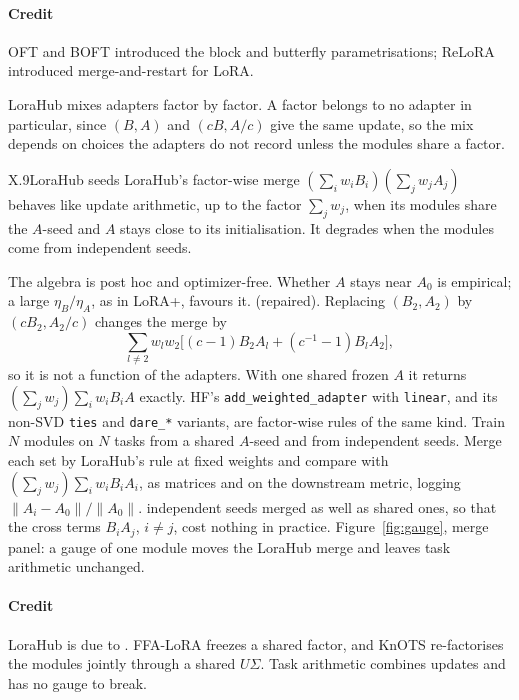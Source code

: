 \paragraph{Credit}
OFT \citep{qiu2023controlling} and BOFT \citep{liu2023parameter} introduced the block and butterfly parametrisations;
ReLoRA \citep{lialin2023relora} introduced merge-and-restart for LoRA.

LoraHub mixes adapters factor by factor. A factor belongs to no adapter in particular, since $(B,A)$ and $(cB,A/c)$ give
the same update, so the mix depends on choices the adapters do not record unless the modules share a factor.

\begin{prediction}{X.9}{LoraHub seeds}
LoraHub's factor-wise merge $(\sum_iw_iB_i)(\sum_jw_jA_j)$ behaves like update arithmetic, up to the factor
$\sum_jw_j$, when its modules share the $A$-seed and $A$ stays close to its initialisation. It degrades when the modules
come from independent seeds.
\begin{predmeta}
   The algebra is post hoc and optimizer-free. Whether $A$ stays near $A_0$ is empirical; a large
    $\eta_B/\eta_A$, as in LoRA+, favours it.
    (repaired). Replacing $(B_2,A_2)$ by $(cB_2,A_2/c)$ changes the merge by
    \begin{equation}\label{eq:pred-lorahub}
      \sum_{l\ne2}w_lw_2\big[(c-1)B_2A_l+(c^{-1}-1)B_lA_2\big],
    \end{equation}
    so it is not a function of the adapters. With one shared frozen $A$ it returns $(\sum_jw_j)\sum_iw_iB_iA$ exactly.
    HF's \texttt{add\_weighted\_adapter} with \texttt{linear}, and its non-SVD \texttt{ties} and \texttt{dare\_*}
    variants, are factor-wise rules of the same kind.
   Train $N$ modules on $N$ tasks from a shared $A$-seed and from independent seeds. Merge each set by
    LoraHub's rule at fixed weights and compare with $(\sum_jw_j)\sum_iw_iB_iA_i$, as matrices and on the downstream
    metric, logging $\lVert A_i-A_0\rVert/\lVert A_0\rVert$.
   independent seeds merged as well as shared ones, so that the cross terms $B_iA_j$, $i\ne j$,
    cost nothing in practice.
   Figure~\ref{fig:gauge}, merge panel: a gauge of one module moves the LoraHub merge and leaves task
    arithmetic unchanged.
\end{predmeta}
\end{prediction}

\paragraph{Credit}
LoraHub is due to \citet{huang2023lorahub}. FFA-LoRA \citep{sun2024improving} freezes a shared factor, and KnOTS
\citep{stoica2024model} re-factorises the modules jointly through a shared $U\Sigma$. Task arithmetic
\citep{ilharco2022editing} combines updates and has no gauge to break.

